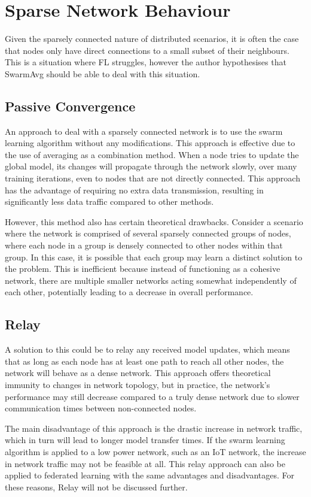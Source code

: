 \section{Sparse Network Behaviour}
Given the sparsely connected nature of distributed scenarios, it is often the case that nodes only have direct connections to a small subset of their neighbours. This is a situation where FL struggles, however the author hypothesises that SwarmAvg should be able to deal with this situation.

\subsection{Passive Convergence}
An approach to deal with a sparsely connected network is to use the swarm learning algorithm without any modifications. This approach is effective due to the use of averaging as a combination method. When a node tries to update the global model, its changes will propagate through the network slowly, over many training iterations, even to nodes that are not directly connected. This approach has the advantage of requiring no extra data transmission, resulting in significantly less data traffic compared to other methods.

However, this method also has certain theoretical drawbacks. Consider a scenario where the network is comprised of several sparsely connected groups of nodes, where each node in a group is densely connected to other nodes within that group. In this case, it is possible that each group may learn a distinct solution to the problem. This is inefficient because instead of functioning as a cohesive network, there are multiple smaller networks acting somewhat independently of each other, potentially leading to a decrease in overall performance.


\subsection{Relay} \label{relay}
A solution to this could be to relay any received model updates, which means that as long as each node has at least one path to reach all other nodes, the network will behave as a dense network. This approach offers theoretical immunity to changes in network topology, but in practice, the network's performance may still decrease compared to a truly dense network due to slower communication times between non-connected nodes.

The main disadvantage of this approach is the drastic increase in network traffic, which in turn will lead to longer model transfer times. If the swarm learning algorithm is applied to a low power network, such as an IoT network, the increase in network traffic may not be feasible at all. This relay approach can also be applied to federated learning with the same advantages and disadvantages. For these reasons, Relay will not be discussed further.

